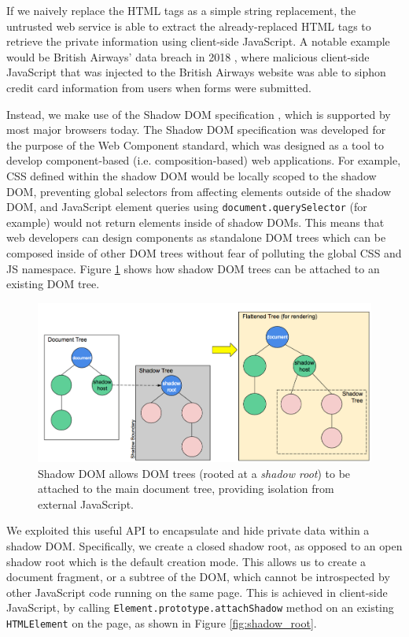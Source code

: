 \documentclass[letterpaper,twocolumn,10pt]{article}
\begin{document}
If we naively replace the HTML tags as a simple string replacement, the untrusted web service is able to extract the already-replaced HTML tags to retrieve the private information using client-side JavaScript. A notable example would be British Airways' data breach in 2018 \cite{Ng:2018}, where malicious client-side JavaScript that was injected to the British Airways website was able to siphon credit card information from users when forms were submitted.

Instead, we make use of the Shadow DOM specification \cite{Bidelman}, which is supported by most major browsers today. The Shadow DOM specification was developed for the purpose of the Web Component standard, which was designed as a tool to develop component-based (i.e. composition-based) web applications. For example, CSS defined within the shadow DOM would be locally scoped to the shadow DOM, preventing global selectors from affecting elements outside of the shadow DOM, and JavaScript element queries using \texttt{document.querySelector} (for example) would not return elements inside of shadow DOMs. This means that web developers can design components as standalone DOM trees which can be composed inside of other DOM trees without fear of polluting the global CSS and JS namespace. Figure \ref{fig:shadow_dom} shows how shadow DOM trees can be attached to an existing DOM tree.

\begin{figure}[]
    \centering
    \includegraphics[width=\columnwidth]{png/shadow-dom.png}
    \caption{Shadow DOM allows DOM trees (rooted at a \textit{shadow root}) to be attached to the main document tree, providing isolation from external JavaScript.}
    \label{fig:shadow_dom}
\end{figure}

We exploited this useful API to encapsulate and hide private data within a shadow DOM. Specifically, we create a closed shadow root, as opposed to an open shadow root which is the default creation mode. This allows us to create a document fragment, or a subtree of the DOM, which cannot be introspected by other JavaScript code running on the same page. This is achieved in client-side JavaScript, by calling \texttt{Element.prototype.attachShadow} method on an existing \texttt{HTMLElement} on the page, as shown in Figure \ref{fig:shadow_root}.
\end{document}
